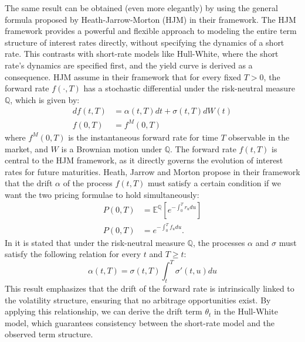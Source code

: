 \documentclass[titlepage, 12pt]{article}
\begin{document}
	The same result can be obtained (even more elegantly) by using the general formula proposed by Heath-Jarrow-Morton (HJM) in their framework. The HJM framework provides a powerful and flexible approach to modeling the entire term structure of interest rates directly, without specifying the dynamics of a short rate. This contrasts with short-rate models like Hull-White, where the short rate's dynamics are specified first, and the yield curve is derived as a consequence. HJM assume in their framework that for every fixed \( T > 0 \), the forward rate \( f(\cdot,T) \) has a stochastic differential under the risk-neutral measure \( \mathbb{Q} \), which is given by:
	\begin{equation}
		\begin{split}
			df(t,T) &= \alpha(t,T)dt + \sigma(t,T)dW(t) \\
			f(0,T) &= f^M(0,T)
		\end{split}
	\end{equation}
	where \( f^M(0,T) \) is the instantaneous forward rate for time \( T \) observable in the market, and \( W \) is a Brownian motion under \( \mathbb{Q} \). The forward rate \( f(t,T) \) is central to the HJM framework, as it directly governs the evolution of interest rates for future maturities. Heath, Jarrow and Morton propose in their framework that the drift \( \alpha \) of the process $f(t,T)$ must satisfy a certain condition if we want the two pricing formulae to hold simultaneously:
	\begin{equation}
		\begin{split}
			P(0,T) &= \mathbb{E}^\mathbb{Q} \left[ e^{-\int_0^T r_u du} \right] \\
			P(0,T) &= e^{-\int_0^T f_u du}.
		\end{split}
	\end{equation}
	In \cite{bjork2019arbitrage} it is stated that under the risk-neutral measure \( \mathbb{Q} \), the processes \( \alpha \) and \( \sigma \) must satisfy the following relation for every \( t \) and \( T \geq t \):
	\begin{equation}\label{eq:hjmdrift}
		\alpha(t,T) = \sigma(t,T)\int_t^T\sigma'(t,u)du
	\end{equation}
	This result emphasizes that the drift of the forward rate is intrinsically linked to the volatility structure, ensuring that no arbitrage opportunities exist. By applying this relationship, we can derive the drift term \( \theta_t \) in the Hull-White model, which guarantees consistency between the short-rate model and the observed term structure.
	
\end{document}
